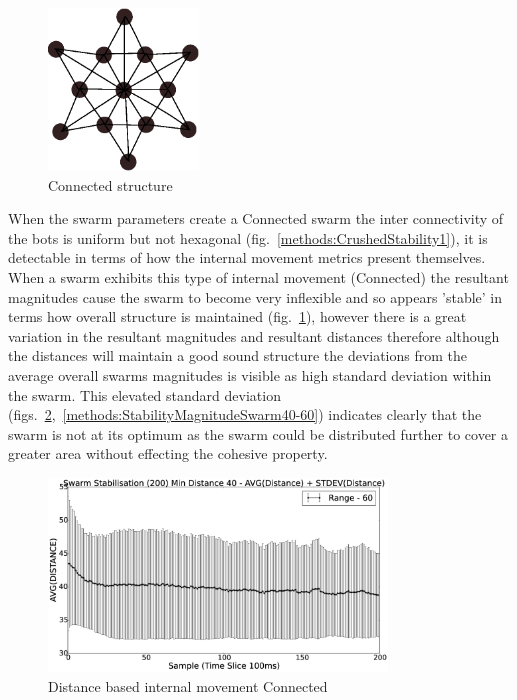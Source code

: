 \documentclass[10pt,journal,letterpaper,twoside]{IEEEtran}
\newcommand{\swarmB}{Connected}
\newcommand{\stability}{internal movement}
\newcommand{\Fig}{fig.}
\newcommand{\Figs}{figs.}
\begin{document}
\begin{figure}[H]
\begin{center}
\includegraphics[width=4cm]{figures/StableFormsCompressed}
\end{center}
\caption{\swarmB{} structure} \label{methods:StableSwarmCompressed}
\end{figure}

When the swarm parameters create a \swarmB{} swarm the inter connectivity of the bots is uniform but not hexagonal (\Fig{}~\ref{methods:CrushedStability1}), it is detectable in terms of how the \stability{} metrics present themselves. When a swarm exhibits this type of \stability{} (\swarmB{}) the resultant magnitudes cause the swarm to become very inflexible and so appears 'stable' in terms how overall structure is maintained (\Fig{}~\ref{methods:StableSwarmCompressed}), however there is a great variation in the resultant magnitudes and resultant distances therefore although the distances will maintain a good sound structure the deviations from the average overall swarms magnitudes is visible as high standard deviation within the swarm.
This elevated standard deviation (\Figs{}~\ref{methods:StabilityDistanceSwarm40-60},~\ref{methods:StabilityMagnitudeSwarm40-60}) indicates clearly that the swarm is not at its optimum as the swarm could be distributed further to cover a greater area without effecting the cohesive property.

\begin{figure}[H]
\begin{center}
\includegraphics[width=9cm]{figures/StabilityDistanceSwarm40-60}
\end{center}
\caption{Distance based \stability{} \swarmB{}\label{methods:StabilityDistanceSwarm40-60}}
\end{figure}
\end{document}
